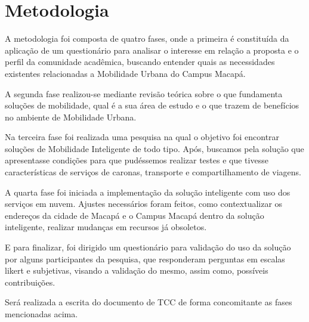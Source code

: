 %
%

\chapter{Metodologia}\label{chap:Metodologia} 
A metodologia foi composta de quatro fases, onde a primeira é constituída da aplicação de um questionário para analisar o interesse em relação a proposta e o perfil da comunidade acadêmica, buscando entender quais as necessidades existentes relacionadas a Mobilidade Urbana do Campus Macapá.%

A segunda fase realizou-se mediante revisão teórica sobre o que fundamenta soluções de mobilidade, qual é a sua área de estudo e o que trazem de benefícios no ambiente de Mobilidade Urbana.

Na terceira fase foi realizada uma pesquisa na qual o objetivo foi encontrar soluções de Mobilidade Inteligente de todo tipo. Após, buscamos pela solução que apresentasse condições para que pudéssemos realizar testes e que tivesse características de serviços de caronas, transporte e compartilhamento de viagens. 

A quarta fase foi iniciada a implementação da solução inteligente com uso dos serviços em nuvem. Ajustes necessários foram feitos, como contextualizar os endereços da cidade de Macapá e o Campus Macapá dentro da solução inteligente, realizar mudanças em recursos já obsoletos.  

E para finalizar, foi dirigido um questionário para  validação do uso da solução por alguns participantes da pesquisa, que responderam perguntas em escalas likert e subjetivas, visando a validação do mesmo, assim como, possíveis contribuições. 

Será realizada a escrita do documento de TCC de forma concomitante as fases mencionadas acima.


